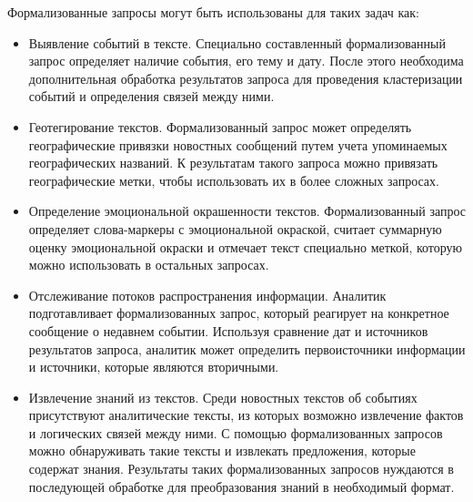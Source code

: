 Формализованные запросы могут быть использованы для таких задач как:
\begin{itemize}
\item Выявление событий в тексте. Специально составленный формализованный запрос определяет наличие события, его тему и дату. После этого необходима дополнительная обработка результатов запроса для проведения кластеризации событий и определения связей между ними.
\item Геотегирование текстов. Формализованный запрос может определять географические привязки новостных сообщений путем учета упоминаемых географических названий. К результатам такого запроса можно привязать географические метки, чтобы использовать их в более сложных запросах.
\item Определение эмоциональной окрашенности текстов. Формализованный запрос определяет слова-маркеры с эмоциональной окраской, считает суммарную оценку эмоциональной окраски и отмечает текст специально меткой, которую можно использовать в остальных запросах.
\item Отслеживание потоков распространения информации. Аналитик подготавливает формализованных запрос, который реагирует на конкретное сообщение о недавнем событии. Используя сравнение дат и источников результатов запроса, аналитик может определить первоисточники информации и источники, которые являются вторичными. 
\item Извлечение знаний из текстов. Среди новостных текстов об событиях присутствуют аналитические тексты, из которых возможно извлечение фактов и логических связей между ними. С помощью формализованных запросов можно обнаруживать такие тексты и извлекать предложения, которые содержат знания. Результаты таких формализованных запросов нуждаются в последующей обработке для преобразования знаний в необходимый формат.
\end{itemize}

